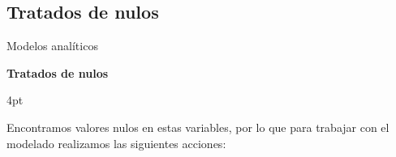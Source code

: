 \documentclass[pdf]{beamer}
\def\\{}%
\def\vspace{}%
\begin{document}
{%

    \subsection{Tratados de nulos}

\begin{frame}{Modelos analíticos}

    \begin{Large}
        \textbf{Tratados de nulos}
    \end{Large}
    \vspace{4pt}

    Encontramos valores nulos en estas variables, por lo que para trabajar con el modelado realizamos las siguientes acciones:


\end{frame}}
\end{document}
